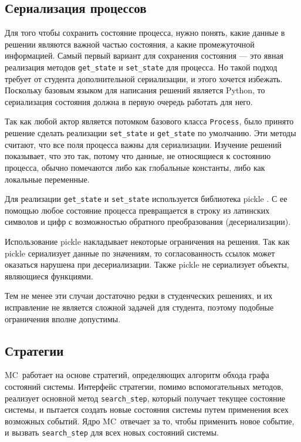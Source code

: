 \documentclass[a4paper,12pt]{extarticle}
\newcommand{\mc}[0]{MC}
\begin{document}
\subsection{Сериализация процессов}

Для того чтобы сохранить состояние процесса, нужно понять, какие данные в решении являются важной частью состояния, а какие промежуточной информацией.
Самый первый вариант для сохранения состояния --- это явная реализация методов \texttt{get\_state} и \texttt{set\_state} для процесса.
Но такой подход требует от студента дополнительной сериализации, и этого хочется избежать.
Поскольку базовым языком для написания решений является Python, то сериализация состояния должна в первую очередь работать для него.

Так как любой актор является потомком базового класса \texttt{Process}, было принято решение сделать реализации \texttt{set\_state} и \texttt{get\_state} по умолчанию.
Эти методы считают, что все поля процесса важны для сериализации.
Изучение решений показывает, что это так, потому что данные, не относящиеся к состоянию процесса, обычно помечаются либо как глобальные константы, либо как локальные переменные.

Для реализации \texttt{get\_state} и \texttt{set\_state} используется библиотека pickle \cite{b24}.
С ее помощью любое состояние процесса превращается в строку из латинских символов и цифр с возможностью обратного преобразования (десериализации).

Использование pickle накладывает некоторые ограничения на решения.
Так как pickle сериализует данные по значениям, то согласованность ссылок может оказаться нарушена при десериализации.
Также pickle не сериализует объекты, являющиеся функциями.

Тем не менее эти случаи достаточно редки в студенческих решениях, и их исправление не является сложной задачей для студента, поэтому подобные ограничения вполне допустимы.

\subsection{Стратегии}

\mc\ работает на основе стратегий, определяющих алгоритм обхода графа состояний системы.
Интерфейс стратегии, помимо вспомогательных методов, реализует основной метод \texttt{search\_step}, который получает текущее состояние системы, и пытается создать новые состояния системы путем применения всех возможных событий.
Ядро \mc\ отвечает за то, чтобы применить новое событие, и вызвать \texttt{search\_step} для всех новых состояний системы.
\end{document}
